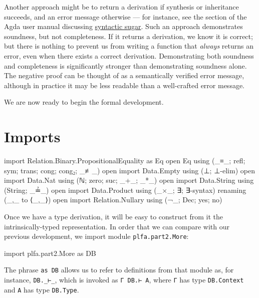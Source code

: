 Another approach might be to return a derivation if synthesis or
inheritance succeeds, and an error message otherwise --- for instance,
see the section of the Agda user manual discussing
\href{https://agda.readthedocs.io/en/latest/language/syntactic-sugar.html\#example}{syntactic
sugar}. Such an approach demonstrates soundness, but not completeness.
If it returns a derivation, we know it is correct; but there is nothing
to prevent us from writing a function that \emph{always} returns an
error, even when there exists a correct derivation. Demonstrating both
soundness and completeness is significantly stronger than demonstrating
soundness alone. The negative proof can be thought of as a semantically
verified error message, although in practice it may be less readable
than a well-crafted error message.

We are now ready to begin the formal development.

\hypertarget{imports}{%
\section{Imports}\label{imports}}

\begin{fence}
\begin{code}
import Relation.Binary.PropositionalEquality as Eq
open Eq using (_≡_; refl; sym; trans; cong; cong₂; _≢_)
open import Data.Empty using (⊥; ⊥-elim)
open import Data.Nat using (ℕ; zero; suc; _+_; _*_)
open import Data.String using (String; _≟_)
open import Data.Product using (_×_; ∃; ∃-syntax) renaming (_,_ to ⟨_,_⟩)
open import Relation.Nullary using (¬_; Dec; yes; no)
\end{code}
\end{fence}

Once we have a type derivation, it will be easy to construct from it the
intrinsically-typed representation. In order that we can compare with
our previous development, we import module \texttt{plfa.part2.More}:

\begin{fence}
\begin{code}
import plfa.part2.More as DB
\end{code}
\end{fence}

The phrase \texttt{as\ DB} allows us to refer to definitions from that
module as, for instance, \texttt{DB.\_⊢\_}, which is invoked as
\texttt{Γ\ DB.⊢\ A}, where \texttt{Γ} has type \texttt{DB.Context} and
\texttt{A} has type \texttt{DB.Type}.

